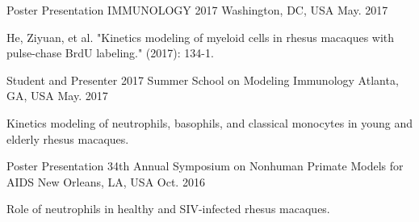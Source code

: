 


\begin{cventries}

 \cventry
    {Poster Presentation} %
    {IMMUNOLOGY 2017 } %
    {Washington, DC, USA} %
    {May. 2017} %
    {
      \begin{cvitems} %
        \item {He, Ziyuan, et al. "Kinetics modeling of myeloid cells in rhesus macaques with pulse-chase BrdU labeling." (2017): 134-1.}
      \end{cvitems}
    }
 \cventry
    {Student and Presenter} %
    {2017 Summer School on Modeling Immunology } %
    {Atlanta, GA, USA} %
    {May. 2017} %
    {
      \begin{cvitems} %
        \item {Kinetics modeling of neutrophils, basophils, and classical monocytes in young and elderly rhesus macaques.}
      \end{cvitems}
    }
 \cventry
    {Poster Presentation} %
    {34th Annual Symposium on Nonhuman Primate Models for AIDS} %
    {New Orleans, LA, USA} %
    {Oct. 2016} %
    {
      \begin{cvitems} %
        \item {Role of neutrophils in healthy and SIV-infected rhesus macaques.}
      \end{cvitems}
    }
\end{cventries}